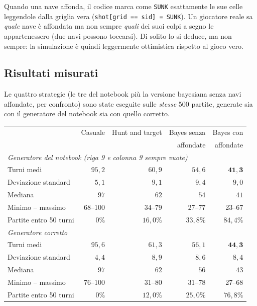 \begin{extra}
Quando una nave affonda, il codice marca come \texttt{SUNK} esattamente le sue celle
leggendole dalla griglia vera (\texttt{shot[grid == sid] = SUNK}). Un giocatore reale sa
\emph{quale} nave è affondata ma non sempre \emph{quali} dei suoi colpi a segno le
appartenessero (due navi possono toccarsi). Di solito lo si deduce, ma non sempre: la
simulazione è quindi leggermente ottimistica rispetto al gioco vero.
\end{extra}

\subsection{Risultati misurati}

Le quattro strategie (le tre del notebook più la versione bayesiana senza navi affondate,
per confronto) sono state eseguite sulle \emph{stesse} 500 partite, generate sia con il
generatore del notebook sia con quello corretto.

\begin{center}
\renewcommand{\arraystretch}{1.22}
\small
\begin{tabular}{lrrrr}
\toprule
 & Casuale & Hunt and target & Bayes senza & Bayes con \\
 &         &                 & affondate   & affondate \\
\midrule
\multicolumn{5}{l}{\emph{Generatore del notebook (riga 9 e colonna 9 sempre vuote)}}\\
Turni medi             & $95{,}2$ & $60{,}9$ & $54{,}6$ & $\mathbf{41{,}3}$ \\
Deviazione standard    & $5{,}1$  & $9{,}1$  & $9{,}4$  & $9{,}0$ \\
Mediana                & $97$     & $62$     & $54$     & $41$ \\
Minimo -- massimo      & 68--100  & 34--79   & 27--77   & 23--67 \\
Partite entro 50 turni & $0\%$    & $16{,}0\%$ & $33{,}8\%$ & $84{,}4\%$ \\
\midrule
\multicolumn{5}{l}{\emph{Generatore corretto}}\\
Turni medi             & $95{,}6$ & $61{,}3$ & $56{,}1$ & $\mathbf{44{,}3}$ \\
Deviazione standard    & $4{,}4$  & $8{,}9$  & $8{,}6$  & $8{,}4$ \\
Mediana                & $97$     & $62$     & $56$     & $43$ \\
Minimo -- massimo      & 76--100  & 31--80   & 31--78   & 27--68 \\
Partite entro 50 turni & $0\%$    & $12{,}0\%$ & $25{,}0\%$ & $76{,}8\%$ \\
\bottomrule
\end{tabular}
\end{center}

